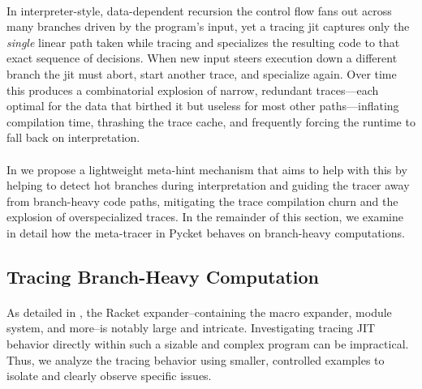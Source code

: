 		\paragraph{}%
			In interpreter-style, data-dependent recursion the control flow fans out across many branches driven by the program's input, yet a tracing \gls{jit} captures only the \emph{single} linear path taken while tracing and specializes the resulting code to that exact sequence of decisions. When new input steers execution down a different branch the \gls{jit} must abort, start another trace, and specialize again. Over time this produces a combinatorial explosion of narrow, redundant traces—each optimal for the data that birthed it but useless for most other paths—inflating compilation time, thrashing the trace cache, and frequently forcing the runtime to fall back on interpretation.

		\paragraph{}%
			In  we propose a lightweight meta-hint mechanism that aims to help with this by helping to detect hot branches during interpretation and guiding the tracer away from branch-heavy code paths, mitigating the trace compilation churn and the explosion of overspecialized traces. In the remainder of this section, we examine in detail how the meta-tracer in Pycket behaves on branch-heavy computations.

		\subsection{Tracing Branch-Heavy Computation}
			\label{section:branchy}

			\paragraph{}%
				As detailed in , the Racket expander--containing the macro expander, module system, and more--is notably large and intricate. Investigating tracing JIT behavior directly within such a sizable and complex program can be impractical. Thus, we analyze the tracing behavior using smaller, controlled examples to isolate and clearly observe specific issues.

